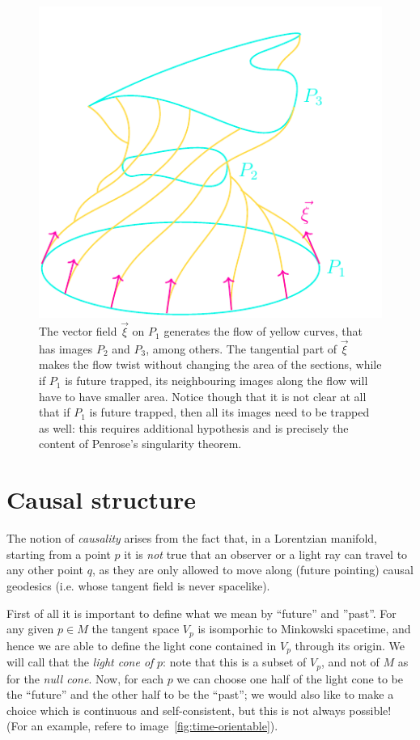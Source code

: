 	\begin{figure}
		\caption[]{The vector field \(\vec{\xi}\) on \(P_1\) generates the flow of yellow curves, that has images \(P_2\) and \(P_3\), among others. The tangential part of \(\vec{\xi}\) makes the flow twist without changing the area of the sections, while if \(P_1\) is future trapped, its neighbouring images along the flow will have to have smaller area. Notice though that it is not clear at all that if \(P_1\) is future trapped, then all its images need to be trapped as well: this requires additional hypothesis and is precisely the content of Penrose's singularity theorem.}
		\label{fig:area-and-curvature}
		\centering
		\includegraphics[scale=1]{Immagini/area-and-curvature/area-and-curvature.pdf}
	\end{figure}


\section{Causal structure}

The notion of \emph{causality} arises from the fact that, in a Lorentzian manifold, starting from a  point \(p\) it is \emph{not} true that an observer or a light ray can travel to any other point \(q\), as they are only allowed to move along (future pointing) causal geodesics (i.e. whose tangent field is never spacelike).

First of all it is important to define what we mean by ``future'' and ''past''. For any given \(p\in M\) the tangent space \(V_p\) is isomporhic to Minkowski spacetime, and hence we are able to define the light cone contained in \(V_p\) through its origin. We will call that the \emph{light cone of} \(p\): note that this is a subset of \(V_p\), and not of \(M\) as for the \emph{null cone}.
Now, for each \(p\) we can choose one half of the light cone to be the ``future'' and the other half to be the ``past''; we would also like to make a choice which is continuous and self-consistent, but this is not always possible! (For an example, refere to image~\ref{fig:time-orientable}).

